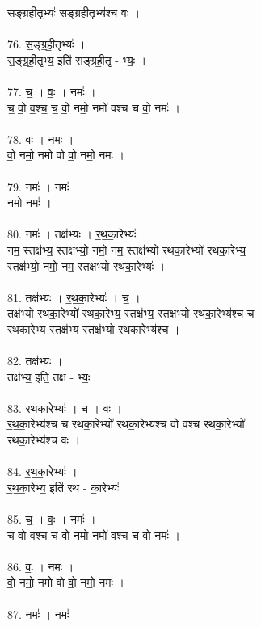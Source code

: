 सङ्ग्रही॒तृभ्यः॑ सङ्ग्रही॒तृभ्य॑श्च वः ।\\
\\
76. स॒ङ्ग्र॒ही॒तृभ्यः॑ ।\\
स॒ङ्ग्र॒ही॒तृभ्य॒ इति॑ सङ्ग्रही॒तृ - भ्यः॒ ।\\
\\
77. च॒ । वः॒ । नमः॑ ।\\
च॒ वो॒ व॒श्च॒ च॒ वो॒ नमो॒ नमो॑ वश्च च वो॒ नमः॑ ।\\
\\
78. वः॒ । नमः॑ ।\\
वो॒ नमो॒ नमो॑ वो वो॒ नमो॒ नमः॑ ।\\
\\
79. नमः॑ । नमः॑ ।\\
नमो॒ नमः॑ ।\\
\\
80. नमः॑ । तक्ष॑भ्यः । र॒थ॒का॒रेभ्यः॑ ।\\
नम॒ स्तक्ष॑भ्य॒ स्तक्ष॑भ्यो॒ नमो॒ नम॒ स्तक्ष॑भ्यो रथका॒रेभ्यो॑ रथका॒रेभ्य॒\\
स्तक्ष॑भ्यो॒ नमो॒ नम॒ स्तक्ष॑भ्यो रथका॒रेभ्यः॑ ।\\
\\
81. तक्ष॑भ्यः । र॒थ॒का॒रेभ्यः॑ । च॒ ।\\
तक्ष॑भ्यो रथका॒रेभ्यो॑ रथका॒रेभ्य॒ स्तक्ष॑भ्य॒ स्तक्ष॑भ्यो रथका॒रेभ्य॑श्च च\\
रथका॒रेभ्य॒ स्तक्ष॑भ्य॒ स्तक्ष॑भ्यो रथका॒रेभ्य॑श्च ।\\
\\
82. तक्ष॑भ्यः ।\\
तक्ष॑भ्य॒ इति॒ तक्ष॑ - भ्यः॒ ।\\
\\
83. र॒थ॒का॒रेभ्यः॑ । च॒ । वः॒ ।\\
र॒थ॒का॒रेभ्य॑श्च च रथका॒रेभ्यो॑ रथका॒रेभ्य॑श्च वो वश्च रथका॒रेभ्यो॑\\
रथका॒रेभ्य॑श्च वः ।\\
\\
84. र॒थ॒का॒रेभ्यः॑ ।\\
र॒थ॒का॒रेभ्य॒ इति॑ रथ - का॒रेभ्यः॑ ।\\
\\
85. च॒ । वः॒ । नमः॑ ।\\
च॒ वो॒ व॒श्च॒ च॒ वो॒ नमो॒ नमो॑ वश्च च वो॒ नमः॑ ।\\
\\
86. वः॒ । नमः॑ ।\\
वो॒ नमो॒ नमो॑ वो वो॒ नमो॒ नमः॑ ।\\
\\
87. नमः॑ । नमः॑ ।\\
